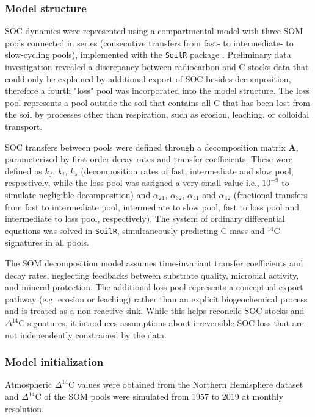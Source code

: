 \documentclass[bg, manuscript]{copernicus}
\begin{document}
\subsubsection{Model structure}
SOC dynamics were represented using a compartmental model with three SOM pools connected in series (consecutive transfers from fast- to intermediate- to slow-cycling pools), implemented with the \texttt{SoilR} package \citep{Sierra2012}. Preliminary data investigation revealed a discrepancy between radiocarbon and C stocks data that could only be explained by additional export of SOC besides decomposition, therefore a fourth "loss" pool was incorporated into the model structure. The loss pool represents a pool outside the soil that contains all C that has been lost from the soil by processes other than respiration, such as erosion, leaching, or colloidal transport.

SOC transfers between pools were defined through a decomposition matrix $\mathbf{A}$, parameterized by first-order decay rates and transfer coefficients. These were defined as $k_f$, $k_i$, $k_s$ (decomposition rates of fast, intermediate and slow pool, respectively, while the loss pool was assigned a very small value i.e., $10^{-9}$ to simulate negligible decomposition) and $\alpha_{21}$, $\alpha_{32}$, $\alpha_{41}$ and $\alpha_{42}$ (fractional transfers from fast to intermediate pool, intermediate to slow pool, fast to loss pool and intermediate to loss pool, respectively). The system of ordinary differential equations was solved in \texttt{SoilR}, simultaneously predicting C mass and $^{14}\text{C}$ signatures in all pools.

The SOM decomposition model assumes time-invariant transfer coefficients and decay rates, neglecting feedbacks between substrate quality, microbial activity, and mineral protection. The additional loss pool represents a conceptual export pathway (e.g. erosion or leaching) rather than an explicit biogeochemical process and is treated as a non-reactive sink. While this helps reconcile SOC stocks and $\Delta^{14}\text{C}$ signatures, it introduces assumptions about irreversible SOC loss that are not independently constrained by the data.

\subsubsection{Model initialization}
Atmospheric $\Delta^{14}\text{C}$ values were obtained from the Northern Hemisphere dataset \citep{Hua2022} and $\Delta^{14}\text{C}$ of the SOM pools were simulated from 1957 to 2019 at monthly resolution.
\end{document}
